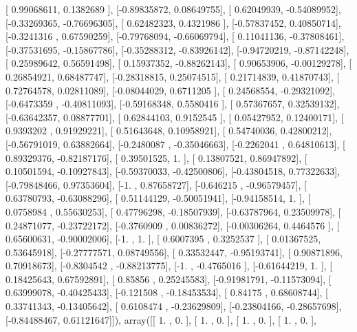 \documentclass{article}
\begin{document}
       [ 0.99068611,  0.1382689 ],
       [-0.89835872,  0.08649755],
       [ 0.62049939, -0.54089952],
       [-0.33269365, -0.76696305],
       [ 0.62482323,  0.4321986 ],
       [-0.57837452,  0.40850714],
       [-0.3241316 ,  0.67590259],
       [-0.79768094, -0.66069794],
       [ 0.11041136, -0.37808461],
       [-0.37531695, -0.15867786],
       [-0.35288312, -0.83926142],
       [-0.94720219, -0.87142248],
       [ 0.25989642,  0.56591498],
       [ 0.15937352, -0.88262143],
       [ 0.90653906, -0.00129278],
       [ 0.26854921,  0.68487747],
       [-0.28318815,  0.25074515],
       [ 0.21714839,  0.41870743],
       [ 0.72764578,  0.02811089],
       [-0.08044029,  0.6711205 ],
       [ 0.24568554, -0.29321092],
       [-0.6473359 , -0.40811093],
       [-0.59168348,  0.5580416 ],
       [ 0.57367657,  0.32539132],
       [-0.63642357,  0.08877701],
       [ 0.62844103,  0.9152545 ],
       [ 0.05427952,  0.12400171],
       [ 0.9393202 ,  0.91929221],
       [ 0.51643648,  0.10958921],
       [ 0.54740036,  0.42800212],
       [-0.56791019,  0.63882664],
       [-0.2480087 , -0.35046663],
       [-0.2262041 ,  0.64810613],
       [ 0.89329376, -0.82187176],
       [ 0.39501525,  1.        ],
       [ 0.13807521,  0.86947892],
       [ 0.10501594, -0.10927843],
       [-0.59370033, -0.42500806],
       [-0.43804518,  0.77322633],
       [-0.79848466,  0.97353604],
       [-1.        ,  0.87658727],
       [-0.646215  , -0.96579457],
       [ 0.63780793, -0.63088296],
       [ 0.51144129, -0.50051941],
       [-0.94158514,  1.        ],
       [ 0.0758984 ,  0.55630253],
       [ 0.47796298, -0.18507939],
       [-0.63787964,  0.23509978],
       [ 0.24871077, -0.23722172],
       [-0.3760909 ,  0.00836272],
       [-0.00306264,  0.4464576 ],
       [ 0.65600631, -0.90002006],
       [-1.        ,  1.        ],
       [ 0.6007395 ,  0.3252537 ],
       [ 0.01367525,  0.53645918],
       [-0.27777571,  0.08749556],
       [ 0.33532447, -0.95193741],
       [ 0.90871896,  0.70918673],
       [-0.8304542 , -0.88213775],
       [-1.        , -0.4765016 ],
       [-0.61644219,  1.        ],
       [ 0.18425643,  0.67592891],
       [ 0.85856   ,  0.25245583],
       [-0.91981791, -0.11573094],
       [ 0.63999078, -0.40425433],
       [-0.121508  , -0.18453534],
       [ 0.84175   ,  0.68608744],
       [ 0.33741343, -0.13405642],
       [ 0.6108474 , -0.23629809],
       [-0.23804166, -0.28657698],
       [-0.84488467,  0.61121647]]), array([[ 1.        ,  0.        ],
       [ 1.        ,  0.        ],
       [ 1.        ,  0.        ],
       [ 1.        ,  0.        ],
\end{document}
